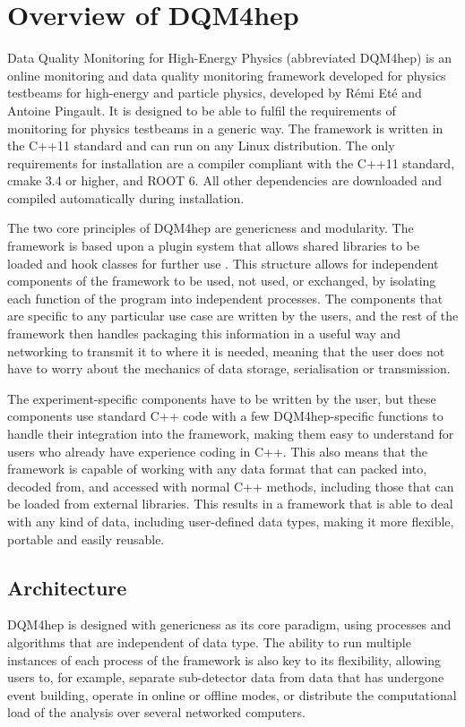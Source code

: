 \section{Overview of DQM4hep}
Data Quality Monitoring for High-Energy Physics (abbreviated \acrshort{DQM4hep}) is an online monitoring and data quality monitoring framework developed for physics testbeams for high-energy and particle physics, developed by R\'{e}mi Et\'{e} and Antoine Pingault. It is designed to be able to fulfil the requirements of monitoring for physics testbeams in a generic way. The framework is written in the C++11 standard and can run on any Linux distribution. The only requirements for installation are a compiler compliant with the C++11 standard, cmake 3.4 or higher, and ROOT 6. All other dependencies are downloaded and compiled automatically during installation. 

The two core principles of \acrshort{DQM4hep} are genericness and modularity. The framework is based upon a plugin system that allows shared libraries to be loaded and hook classes for further use \cite{aida2020-milestone-dqm4hep}. This structure allows for independent components of the framework to be used, not used, or exchanged, by isolating each function of the program into independent processes. The components that are specific to any particular use case are written by the users, and the rest of the framework then handles packaging this information in a useful way and networking to transmit it to where it is needed, meaning that the user does not have to worry about the mechanics of data storage, serialisation or transmission. 

The experiment-specific components have to be written by the user, but these components use standard C++ code with a few \acrshort{DQM4hep}-specific functions to handle their integration into the framework, making them easy to understand for users who already have experience coding in C++. This also means that the framework is capable of working with any data format that can packed into, decoded from, and accessed with normal C++ methods, including those that can be loaded from external libraries. This results in a framework that is able to deal with any kind of data, including user-defined data types, making it more flexible, portable and easily reusable.

\subsection{Architecture}
\acrshort{DQM4hep} is designed with genericness as its core paradigm, using processes and algorithms that are independent of data type. The ability to run multiple instances of each process of the framework is also key to its flexibility, allowing users to, for example, separate sub-detector data from data that has undergone event building, operate in online or offline modes, or distribute the computational load of the analysis over several networked computers.

